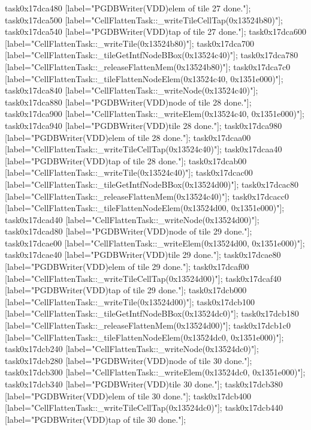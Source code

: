 {	task0x17dca480 [label="PGDBWriter(VDD)\nCell elem of tile 27 done."];
	task0x17dca500 [label="CellFlattenTask::_writeTileCellTap(0x13524b80)"];
	task0x17dca540 [label="PGDBWriter(VDD)\nCell tap of tile 27 done."];
	task0x17dca600 [label="CellFlattenTask::_writeTile(0x13524b80)"];
	task0x17dca700 [label="CellFlattenTask::_tileGetIntfNodeBBox(0x13524c40)"];
	task0x17dca780 [label="CellFlattenTask::_releaseFlattenMem(0x13524b80)"];
	task0x17dca7c0 [label="CellFlattenTask::_tileFlattenNodeElem(0x13524c40, 0x1351e000)"];
	task0x17dca840 [label="CellFlattenTask::_writeNode(0x13524c40)"];
	task0x17dca880 [label="PGDBWriter(VDD)\nCell node of tile 28 done."];
	task0x17dca900 [label="CellFlattenTask::_writeElem(0x13524c40, 0x1351e000)"];
	task0x17dca940 [label="PGDBWriter(VDD)\nCell tile 28 done."];
	task0x17dca980 [label="PGDBWriter(VDD)\nCell elem of tile 28 done."];
	task0x17dcaa00 [label="CellFlattenTask::_writeTileCellTap(0x13524c40)"];
	task0x17dcaa40 [label="PGDBWriter(VDD)\nCell tap of tile 28 done."];
	task0x17dcab00 [label="CellFlattenTask::_writeTile(0x13524c40)"];
	task0x17dcac00 [label="CellFlattenTask::_tileGetIntfNodeBBox(0x13524d00)"];
	task0x17dcac80 [label="CellFlattenTask::_releaseFlattenMem(0x13524c40)"];
	task0x17dcacc0 [label="CellFlattenTask::_tileFlattenNodeElem(0x13524d00, 0x1351e000)"];
	task0x17dcad40 [label="CellFlattenTask::_writeNode(0x13524d00)"];
	task0x17dcad80 [label="PGDBWriter(VDD)\nCell node of tile 29 done."];
	task0x17dcae00 [label="CellFlattenTask::_writeElem(0x13524d00, 0x1351e000)"];
	task0x17dcae40 [label="PGDBWriter(VDD)\nCell tile 29 done."];
	task0x17dcae80 [label="PGDBWriter(VDD)\nCell elem of tile 29 done."];
	task0x17dcaf00 [label="CellFlattenTask::_writeTileCellTap(0x13524d00)"];
	task0x17dcaf40 [label="PGDBWriter(VDD)\nCell tap of tile 29 done."];
	task0x17dcb000 [label="CellFlattenTask::_writeTile(0x13524d00)"];
	task0x17dcb100 [label="CellFlattenTask::_tileGetIntfNodeBBox(0x13524dc0)"];
	task0x17dcb180 [label="CellFlattenTask::_releaseFlattenMem(0x13524d00)"];
	task0x17dcb1c0 [label="CellFlattenTask::_tileFlattenNodeElem(0x13524dc0, 0x1351e000)"];
	task0x17dcb240 [label="CellFlattenTask::_writeNode(0x13524dc0)"];
	task0x17dcb280 [label="PGDBWriter(VDD)\nCell node of tile 30 done."];
	task0x17dcb300 [label="CellFlattenTask::_writeElem(0x13524dc0, 0x1351e000)"];
	task0x17dcb340 [label="PGDBWriter(VDD)\nCell tile 30 done."];
	task0x17dcb380 [label="PGDBWriter(VDD)\nCell elem of tile 30 done."];
	task0x17dcb400 [label="CellFlattenTask::_writeTileCellTap(0x13524dc0)"];
	task0x17dcb440 [label="PGDBWriter(VDD)\nCell tap of tile 30 done."];
}
